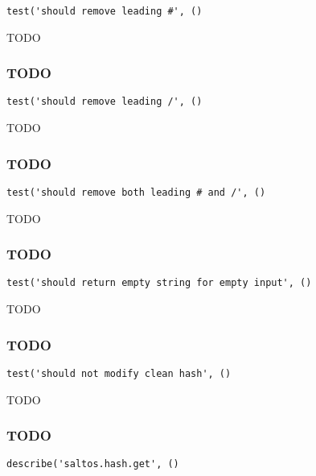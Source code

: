 \documentclass[a4paper]{article}
\begin{document}
\begin{lstlisting}
test('should remove leading #', ()
\end{lstlisting}

TODO

\hypertarget{toc633}{}
\subsubsection{TODO}

\begin{lstlisting}
test('should remove leading /', ()
\end{lstlisting}

TODO

\hypertarget{toc634}{}
\subsubsection{TODO}

\begin{lstlisting}
test('should remove both leading # and /', ()
\end{lstlisting}

TODO

\hypertarget{toc635}{}
\subsubsection{TODO}

\begin{lstlisting}
test('should return empty string for empty input', ()
\end{lstlisting}

TODO

\hypertarget{toc636}{}
\subsubsection{TODO}

\begin{lstlisting}
test('should not modify clean hash', ()
\end{lstlisting}

TODO

\hypertarget{toc637}{}
\subsubsection{TODO}

\begin{lstlisting}
describe('saltos.hash.get', ()
\end{lstlisting}
\end{document}
